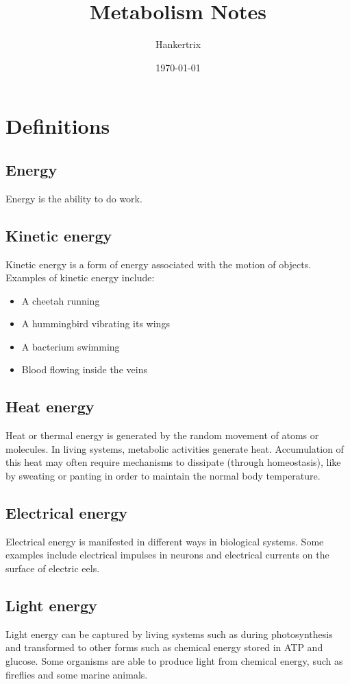 \documentclass[11pt]{article}
\author{Hankertrix}
\date{\today}
\title{Metabolism Notes}
\begin{document}
\maketitle
\setcounter{tocdepth}{2}
\tableofcontents \clearpage\newpage
\section{Definitions}
\label{sec:org918b136}

\subsection{Energy}
\label{sec:org15d9347}
Energy is the ability to do work.
\subsection{Kinetic energy}
\label{sec:org4411607}
Kinetic energy is a form of energy associated with the motion of objects. Examples of kinetic energy include:
\begin{itemize}
\item A cheetah running
\item A hummingbird vibrating its wings
\item A bacterium swimming
\item Blood flowing inside the veins
\end{itemize}
\subsection{Heat energy}
\label{sec:org57aa6e5}
Heat or thermal energy is generated by the random movement of atoms or molecules. In living systems, metabolic activities generate heat. Accumulation of this heat may often require mechanisms to dissipate (through homeostasis), like by sweating or panting in order to maintain the normal body temperature.
\subsection{Electrical energy}
\label{sec:org62f222f}
Electrical energy is manifested in different ways in biological systems. Some examples include electrical impulses in neurons and electrical currents on the surface of electric eels.
\subsection{Light energy}
\label{sec:org72d71c2}
Light energy can be captured by living systems such as during photosynthesis and transformed to other forms such as chemical energy stored in ATP and glucose. Some organisms are able to produce light from chemical energy, such as fireflies and some marine animals.
\end{document}
